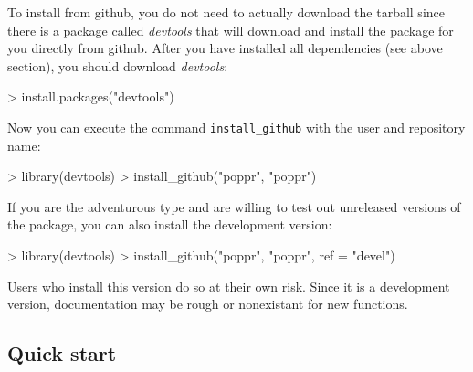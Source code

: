 \documentclass[letterpaper]{article}
\begin{document}
To install from github, you do not need to actually download the tarball since there is a package called \textit{devtools} that will download and install the package for you directly from github. After you have installed all dependencies (see above section), you should download \textit{devtools}:
\begin{Schunk}
\begin{Sinput}
> install.packages("devtools")
\end{Sinput}
\end{Schunk}
Now you can execute the command \texttt{install\_github} with the user and repository name:
\begin{Schunk}
\begin{Sinput}
> library(devtools)
> install_github("poppr", "poppr")
\end{Sinput}
\end{Schunk}

If you are the adventurous type and are willing to test out unreleased versions of the package, you can also install the development version:
\begin{Schunk}
\begin{Sinput}
> library(devtools)
> install_github("poppr", "poppr", ref = "devel")
\end{Sinput}
\end{Schunk}
Users who install this version do so at their own risk. Since it is a development version, documentation may be rough or nonexistant for new functions. 

\subsection{Quick start}\label{intro:qstart}
\end{document}
